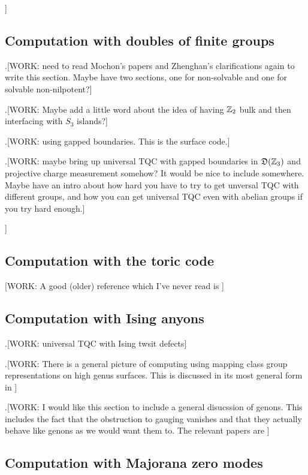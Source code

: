 ]

\subsection{Computation with doubles of finite groups}

.[WORK: need to read Mochon's papers and Zhenghan's clarifications again to write this section. Maybe have two sections, one for non-solvable and one for solvable non-nilpotent?]

.[WORK: Maybe add a little word about the idea of having $\mathbb{Z}_2$ bulk and then interfacing with $S_3$ islands?]

.[WORK: using gapped boundaries. This is the surface code.]

.[WORK: maybe bring up universal TQC with gapped boundaries in $\mathfrak{D}(\mathbb{Z}_3)$ and projective charge measurement somehow? It would be nice to include somewhere. Maybe have an intro about how hard you have to try to get unversal TQC with different groups, and how you can get universal TQC even with abelian groups if you try hard enough.]

]
\subsection{Computation with the toric code}

[WORK: A good (older) reference which I've never read is \cite{dennis2002topological}]


\subsection{Computation with Ising anyons}

.[WORK: universal TQC with Ising twsit defects]

.[WORK: There is a general picture of computing using mapping class group representations on high genus surfaces. This is discussed in its most general form in \cite{bloomquist2018topological}]


.[WORK: I would like this section to include a general disucssion of genons. This includes the fact that the obstruction to gauging vanishes and that they actually behave like genons as we would want them to. The relevant papers are \cite{gannon2019vanishing, delaney2019categorical, barkeshli2013twist}]


\subsection{Computation with Majorana zero modes}

